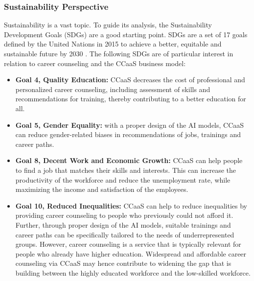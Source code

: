 \subsubsection{Sustainability Perspective}

Sustainability is a vast topic. To guide its analysis, the Sustainability Development Goals (SDGs) are a
good starting point. SDGs are a set of 17 goals defined by the United Nations in 2015 to achieve a better,
equitable and sustainable future by 2030 \citep{unitednationsTransformingOurWorld2015a}. The following SDGs
are of particular interest in relation to career counseling and the CCaaS business model:

\begin{itemize}
    \item \textbf{Goal 4, Quality Education:} CCaaS decreases the cost of professional and personalized
        career counseling, including assessment of skills and recommendations for training, thereby
        contributing to a better education for all.
    \item \textbf{Goal 5, Gender Equality:} with a proper design of the AI models, CCaaS can reduce 
        gender-related biases in recommendations of jobs, trainings and career paths.
    \item \textbf{Goal 8, Decent Work and Economic Growth:} CCaaS can help people to find a job that
        matches their skills and interests. This can increase the productivity of the workforce and
        reduce the unemployment rate, while maximizing the income and satisfaction of the employees.
    \item \textbf{Goal 10, Reduced Inequalities:} CCaaS can help to reduce inequalities by providing
        career counseling to people who previously could not afford it. Further, through proper design
        of the AI models, suitable trainings and career paths can be specifically tailored to the
        needs of underrepresented groups. However, career counseling is a service that is typically
        relevant for people who already have higher education. Widespread and affordable career
        counseling via CCaaS may hence contribute to widening the gap that is building between the
        highly educated workforce and the low-skilled workforce.
\end{itemize}
